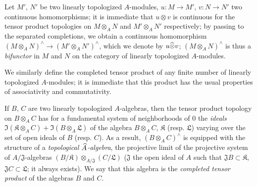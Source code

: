 \begin{env}[7.7.3]
\label{0.7.7.3}
Let $M'$, $N'$ be two linearly topologized $A$-modules, $u:M\to M'$, $v:N\to N'$ two continuous
homomorphisms; it is immediate that $u\otimes v$ is continuous for the tensor product topologies on
$M\otimes_A N$ and $M'\otimes_A N'$ respectively; by passing to the separated completions, we obtain
a continuous homomorphism $(M\otimes_A N)^\wedge\to(M'\otimes_A N')^\wedge$, which we denote by
$u\widehat{\otimes}v$; $(M\otimes_A N)^\wedge$ is thus a \emph{bifunctor} in $M$ and $N$ on the category
of linearly topologized $A$-modules.
\end{env}

\begin{env}[7.7.4]
\label{0.7.7.4}
We similarly define the completed tensor product of any finite number of linearly topologized
$A$-modules; it is immediate that this product has the usual properties of associativity and
commutativity.
\end{env}

\begin{env}[7.7.5]
\label{0.7.5.5}
If $B$, $C$ are two linearly topologized $A$-algebras, then the tensor product topology on
$B\otimes_A C$ has for a fundamental system of neighborhoods of $0$ the \emph{ideals}
$\Im(\mathfrak{K}\otimes_A C)+\Im(B\otimes_A\mathfrak{L})$ of the algebra $B\otimes_A C$,
$\mathfrak{K}$ (resp. $\mathfrak{L}$) varying over the set of open ideals of $B$ (resp. $C$).
As a result, $(B\otimes_A C)^\wedge$ is equipped with the structure of a \emph{topological
$\widehat{A}$-algebra}, the projective limit of the projective system of $A/\mathfrak{J}$-algebras
$(B/\mathfrak{K})\otimes_{A/\mathfrak{J}}(C/\mathfrak{L})$ ($\mathfrak{J}$ the open ideal of $A$
such that $\mathfrak{J}B\subset\mathfrak{K}$, $\mathfrak{J}C\subset\mathfrak{L}$; it always exists).
We say that this algebra is the \emph{completed tensor product} of the algebras $B$ and $C$.
\end{env}

